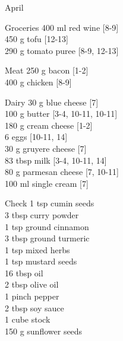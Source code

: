 \begin{menu}{April}
\begin{shoppinglist}{Groceries}
      400 ml red wine {\scriptsize[8-9]}\\
      450 g tofu {\scriptsize[12-13]}\\
      290 g tomato puree {\scriptsize[8-9, 12-13]}\\
      \end{shoppinglist}%
      \par\vfil %
      \begin{shoppinglist}{Meat}
      250 g bacon {\scriptsize[1-2]}\\
      400 g chicken {\scriptsize[8-9]}\\
      \end{shoppinglist}%
      \begin{shoppinglist}{Dairy}
      30 g blue cheese {\scriptsize[7]}\\
      100 g butter {\scriptsize[3-4, 10-11, 10-11]}\\
      180 g cream cheese {\scriptsize[1-2]}\\
      6  eggs {\scriptsize[10-11, 14]}\\
      30 g gruyere cheese {\scriptsize[7]}\\
      83 tbsp milk {\scriptsize[3-4, 10-11, 14]}\\
      80 g parmesan cheese {\scriptsize[7, 10-11]}\\
      100 ml single cream {\scriptsize[7]}\\
      \end{shoppinglist}%
      \par\vfil %
      \vfil\clearpage %
      \begin{shoppinglist}{Check}
      1 tsp cumin seeds \\
      3 tbsp curry powder \\
      1 tsp ground cinnamon \\
      3 tbsp ground turmeric \\
      1 tsp mixed herbs \\
      1 tsp mustard seeds \\
      16 tbsp oil \\
      2 tbsp olive oil \\
      1 pinch pepper \\
      2 tbsp soy sauce \\
      1 cube stock \\
      150 g sunflower seeds \\
      \end{shoppinglist}%

\end{menu}
